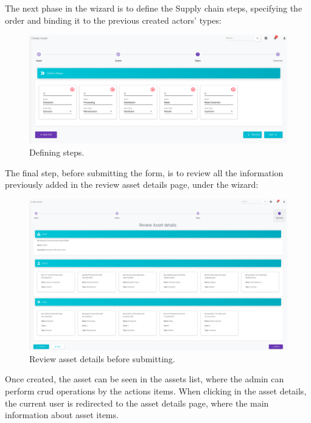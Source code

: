 The next phase in the wizard is to define the Supply chain steps, specifying the order and binding it to the previous created actors' types:

\begin{figure}[H]
\begin{center}
  \includegraphics[scale=0.27]{images/use_example/03_create_asset_3.png}
\caption{Defining steps.}
\label{fig:create_asset_3}
\end{center}
\end{figure}

The final step, before submitting the form, is to review all the information previously added in the review asset details page, under the wizard:
\begin{figure}[H]
\begin{center}
  \includegraphics[scale=0.265]{images/use_example/04_create_asset_4.png}
\caption{Review asset details before submitting.}
\label{fig:create_asset_4}
\end{center}
\end{figure}


Once created, the asset can be seen in the assets list, where the admin can perform crud operations by the actions items. When clicking in the asset details, the current user is redirected to the asset details page, where the main information about asset items.



